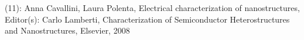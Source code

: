 \documentclass[preview]{standalone}
\begin{document}
\begin{center}
(11): Anna Cavallini, Laura Polenta, Electrical characterization of nanostructures, Editor(s): Carlo Lamberti, Characterization of Semiconductor Heterostructures and Nanostructures, Elsevier, 2008
\end{center}
\end{document}

